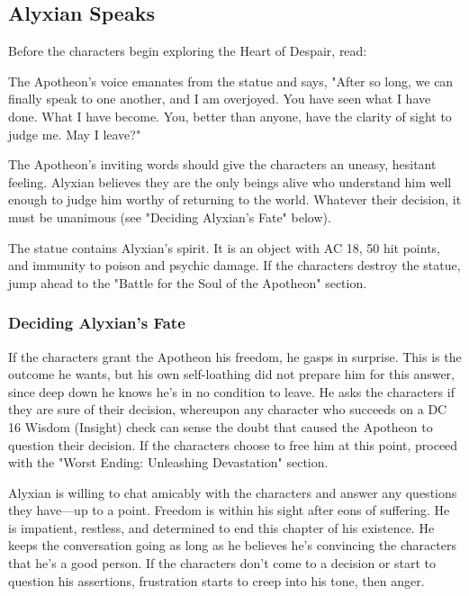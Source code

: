 \documentclass[a4paper, 11pt, bg=full, twocolumn, nooutline]{dndbook}
\begin{document}
\subsection{Alyxian Speaks}

Before the characters begin exploring the Heart of Despair, read:

\begin{DndReadAloud}
The Apotheon's voice emanates from the statue and says, "After so long, we can finally speak to one another, and I am overjoyed. You have seen what I have done. What I have become. You, better than anyone, have the clarity of sight to judge me. May I leave?"
\end{DndReadAloud}

The Apotheon's inviting words should give the characters an uneasy, hesitant feeling. Alyxian believes they are the only beings alive who understand him well enough to judge him worthy of returning to the world. Whatever their decision, it must be unanimous (see "Deciding Alyxian's Fate" below).

The statue contains Alyxian's spirit. It is an object with AC 18, 50 hit points, and immunity to poison and psychic damage. If the characters destroy the statue, jump ahead to the "Battle for the Soul of the Apotheon" section.

\subsubsection{Deciding Alyxian's Fate}

If the characters grant the Apotheon his freedom, he gasps in surprise. This is the outcome he wants, but his own self-loathing did not prepare him for this answer, since deep down he knows he's in no condition to leave. He asks the characters if they are sure of their decision, whereupon any character who succeeds on a DC 16 Wisdom (Insight) check can sense the doubt that caused the Apotheon to question their decision. If the characters choose to free him at this point, proceed with the "Worst Ending: Unleashing Devastation" section.

Alyxian is willing to chat amicably with the characters and answer any questions they have---up to a point. Freedom is within his sight after eons of suffering. He is impatient, restless, and determined to end this chapter of his existence. He keeps the conversation going as long as he believes he's convincing the characters that he's a good person. If the characters don't come to a decision or start to question his assertions, frustration starts to creep into his tone, then anger.
\end{document}
